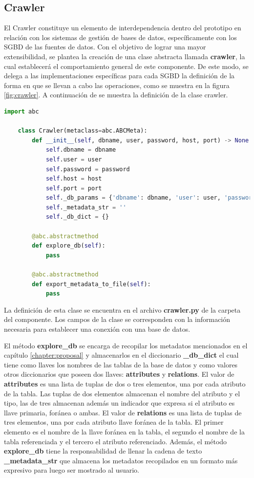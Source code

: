 \subsection{Crawler}

El Crawler constituye un elemento de interdependencia dentro del prototipo en relación con los sistemas 
de gestión de bases de datos, específicamente con los SGBD de las fuentes de datos. Con el objetivo de lograr una 
mayor extensibilidad, se plantea la creación de una clase abstracta llamada \textbf{crawler}, la cual establecerá 
el comportamiento general de este componente. De este modo, se delega a las implementaciones específicas para cada 
SGBD la definición de la forma en que se llevan a cabo las operaciones, como se muestra en la figura \ref{fig:crawler}.
A continuación de se muestra la definición de la clase crawler.

\begin{lstlisting}[label={code:crawler}, caption={clase abstracta crawler}, language={python}]
    import abc

    class Crawler(metaclass=abc.ABCMeta):
        def __init__(self, dbname, user, password, host, port) -> None:
            self.dbname = dbname
            self.user = user
            self.password = password
            self.host = host
            self.port = port
            self._db_params = {'dbname': dbname, 'user': user, 'password': password, 'host': host, 'port': port}
            self._metadata_str = ''
            self._db_dict = {}

        @abc.abstractmethod
        def explore_db(self):
            pass
        
        @abc.abstractmethod
        def export_metadata_to_file(self):
            pass

\end{lstlisting}

La definición de esta clase se encuentra en el archivo \textbf{crawler.py} de la carpeta del componente. Los 
campos de la clase se corresponden con la informaci\'on necesaria para establecer una conexi\'on con una base de 
datos. 

El m\'etodo \textbf{explore\_db} se encarga de recopilar los metadatos mencionados en el cap\'itulo \ref{chapter:proposal}
y almacenarlos en el diccionario \textbf{\_db\_dict} el cual tiene como llaves los nombres de las tablas de la base 
de datos y como valores otros diccionarios que poseen dos llaves: \textbf{attributes} y \textbf{relations}. 
El valor de \textbf{attributes} es una lista de tuplas de dos o tres elementos, una por cada atributo de la tabla. 
Las tuplas de dos elementos almacenan el nombre del atributo y el tipo, las de tres almacenan adem\'as un indicador 
que expresa si el atributo es llave primaria, for\'anea o ambas. El valor de \textbf{relations} es una lista de 
tuplas de tres elementos, una por cada atributo llave for\'anea de la tabla. El primer elemento es el nombre 
de la llave for\'anea en la tabla, el segundo el nombre de la tabla referenciada y el tercero el atributo referenciado. 
Adem\'as, el m\'etodo \textbf{explore\_db} tiene la responsabilidad de llenar la cadena de texto \textbf{\_metadata\_str} 
que almacena los metadatos recopilados en un formato m\'as expresivo para luego ser mostrado al usuario.

